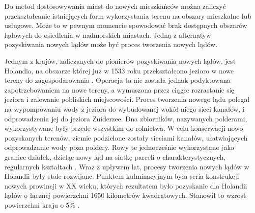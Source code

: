 \documentclass{amuthesis}
\begin{document}
Do metod dostosowywania miast do nowych mieszkańców można zaliczyć
przekształcanie istniejących form wykorzystania terenu na obszary
mieszkalne lub usługowe. Może to w pewnym momencie spowodować brak
dostępnych obszarów lądowych do osiedlenia w nadmorskich miastach. Jedną
z alternatyw pozyskiwania nowych lądów może być proces tworzenia nowych
lądów.

Jednym z krajów, zaliczanych do pionierów pozyskiwania nowych lądów,
jest Holandia, na obszarze której już w 1533 roku przekształcono jezioro
w nowe tereny do zagospodarowania \autocite{ven1993man}. Operacja ta nie
została jednak podyktowana zapotrzebowaniem na nowe tereny, a wymuszona
przez ciągłe rozrastanie się jeziora i zalewanie pobliskich
miejscowości. Proces tworzenia nowego lądu polegał na wypompowaniu wody
z jeziora do wybudowanej wokół niego sieci kanałów, i odprowadzenia jej
do jeziora Zuiderzee. Dna zbiorników, nazywanych polderami,
wykorzystywane były przede wszystkim do rolnictwa. W celu konserwacji
nowo pozyskanych terenów, ziemie podzielone zostały sieciami kanałów,
ułatwiających odprowadzanie wody poza poldery. Rowy te jednocześnie
wykorzystano jako granice działek, dzieląc nowy ląd na siatkę parceli o
charakterystycznych, regularnych kształtach
\autocite{hoeksema2007three}. Wraz z upływem lat, procesy tworzenia
nowych lądów w Holandii były stale rozwijane. Punktem kulminacyjnym była
seria konstrukcji nowych prowincji w XX wieku, których rezultatem było
pozyskanie dla Holandii lądów o łącznej powierzchni 1650 kilometrów
kwadratowych. Stanowił to wzrost powierzchni kraju o 5\%
\autocite{hoeksema2007three}.
\end{document}
